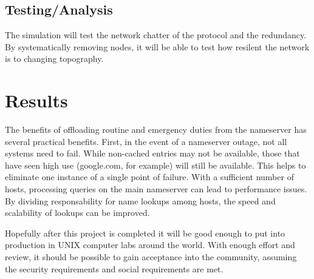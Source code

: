 \documentclass[12pt,letterpaper,titlepage]{article}
\begin{document}
\subsection{Testing/Analysis}
The simulation will test the network chatter of the protocol and the redundancy. By systematically removing nodes, it will be able to test how resilent the network is to changing topography.
\section{Results}
The benefits of offloading routine and emergency duties from the nameserver has several practical benefits. First, in the event of a nameserver outage, not all systems need to fail. While non-cached entries may not be available, those that have seen high use (google.com, for example) will still be available. This helps to eliminate one instance of a single point of failure. With a sufficient number of hosts, processing queries on the main nameserver can lead to performance issues. By dividing responsability for name lookups among hosts, the speed and scalability of lookups can be improved.

Hopefully after this project is completed it will be good enough to put into production in UNIX computer labs around the world. With enough effort and review, it should be possible to gain acceptance into the community, assuming the security requirements and social requirements are met.
\end{document}
